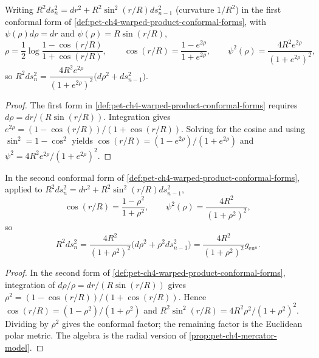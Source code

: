 \begin{proposition}
  \label{prop:pet-ch4-mercator-model}

  Writing $R^2ds_n^2=dr^2+R^2\sin^2(r/R)ds_{n-1}^2$ (curvature $1/R^2$) in the
  first conformal form of \cref{def:pet-ch4-warped-product-conformal-forms},
  with $\psi(\rho)d\rho=dr$ and $\psi(\rho)=R\sin(r/R)$,
  \[
    \rho=\frac12\log\frac{1-\cos(r/R)}{1+\cos(r/R)},\qquad
    \cos(r/R)=\frac{1-e^{2\rho}}{1+e^{2\rho}},\qquad
    \psi^2(\rho)=\frac{4R^2e^{2\rho}}{(1+e^{2\rho})^2},
  \]
  so $R^2ds_n^2=\dfrac{4R^2e^{2\rho}}{(1+e^{2\rho})^2}\big(d\rho^2+ds_{n-1}^2\big)$.
\end{proposition}
\begin{proof}
  \sketch
  The first form in \cref{def:pet-ch4-warped-product-conformal-forms} requires
  $d\rho=dr/(R\sin(r/R))$. Integration gives
  $e^{2\rho}=(1-\cos(r/R))/(1+\cos(r/R))$. Solving for the cosine and using
  $\sin^2=1-\cos^2$ yields
  $\cos(r/R)=(1-e^{2\rho})/(1+e^{2\rho})$ and
  $\psi^2=4R^2e^{2\rho}/(1+e^{2\rho})^2$.
\end{proof}

\begin{proposition}
  \label{prop:pet-ch4-sphere-stereographic-conformal}

  In the second conformal form of
  \cref{def:pet-ch4-warped-product-conformal-forms}, applied to
  $R^2ds_n^2=dr^2+R^2\sin^2(r/R)ds_{n-1}^2$,
  \[
    \cos(r/R)=\frac{1-\rho^2}{1+\rho^2},\qquad
    \psi^2(\rho)=\frac{4R^2}{(1+\rho^2)^2},
  \]
  so
  \[
    R^2ds_n^2=\frac{4R^2}{(1+\rho^2)^2}\big(d\rho^2+\rho^2ds_{n-1}^2\big)
    =\frac{4R^2}{(1+\rho^2)^2}g_{\mathrm{eu}^n}.
  \]
\end{proposition}
\begin{proof}
  \sketch
  In the second form of
  \cref{def:pet-ch4-warped-product-conformal-forms}, integration of
  $d\rho/\rho=dr/(R\sin(r/R))$ gives
  $\rho^2=(1-\cos(r/R))/(1+\cos(r/R))$. Hence
  $\cos(r/R)=(1-\rho^2)/(1+\rho^2)$ and
  $R^2\sin^2(r/R)=4R^2\rho^2/(1+\rho^2)^2$. Dividing by $\rho^2$ gives the
  conformal factor; the remaining factor is the Euclidean polar metric. The
  algebra is the radial version of \cref{prop:pet-ch4-mercator-model}.
\end{proof}

